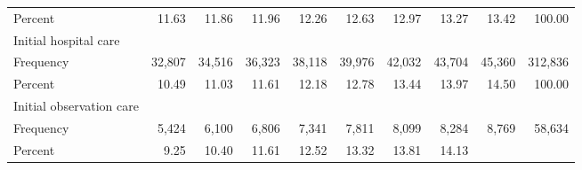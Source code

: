 \documentclass{article}
\begin{document}
\begin{table}[!h]
\begin{tabular}{llllllllll}
\multicolumn{1}{l}{\hspace{2em}Percent} &
  \multicolumn{1}{|r}{11.63} &
  \multicolumn{1}{r}{11.86} &
  \multicolumn{1}{r}{11.96} &
  \multicolumn{1}{r}{12.26} &
  \multicolumn{1}{r}{12.63} &
  \multicolumn{1}{r}{12.97} &
  \multicolumn{1}{r}{13.27} &
  \multicolumn{1}{r}{13.42} &
  \multicolumn{1}{r}{100.00} \\
\multicolumn{1}{l}{\hspace{1em}Initial hospital care} &
  \multicolumn{1}{|r}{} &
  \multicolumn{1}{r}{} &
  \multicolumn{1}{r}{} &
  \multicolumn{1}{r}{} &
  \multicolumn{1}{r}{} &
  \multicolumn{1}{r}{} &
  \multicolumn{1}{r}{} &
  \multicolumn{1}{r}{} &
  \multicolumn{1}{r}{} \\
\multicolumn{1}{l}{\hspace{2em}Frequency} &
  \multicolumn{1}{|r}{32,807} &
  \multicolumn{1}{r}{34,516} &
  \multicolumn{1}{r}{36,323} &
  \multicolumn{1}{r}{38,118} &
  \multicolumn{1}{r}{39,976} &
  \multicolumn{1}{r}{42,032} &
  \multicolumn{1}{r}{43,704} &
  \multicolumn{1}{r}{45,360} &
  \multicolumn{1}{r}{312,836} \\
\multicolumn{1}{l}{\hspace{2em}Percent} &
  \multicolumn{1}{|r}{10.49} &
  \multicolumn{1}{r}{11.03} &
  \multicolumn{1}{r}{11.61} &
  \multicolumn{1}{r}{12.18} &
  \multicolumn{1}{r}{12.78} &
  \multicolumn{1}{r}{13.44} &
  \multicolumn{1}{r}{13.97} &
  \multicolumn{1}{r}{14.50} &
  \multicolumn{1}{r}{100.00} \\
\multicolumn{1}{l}{\hspace{1em}Initial observation care} &
  \multicolumn{1}{|r}{} &
  \multicolumn{1}{r}{} &
  \multicolumn{1}{r}{} &
  \multicolumn{1}{r}{} &
  \multicolumn{1}{r}{} &
  \multicolumn{1}{r}{} &
  \multicolumn{1}{r}{} &
  \multicolumn{1}{r}{} &
  \multicolumn{1}{r}{} \\
\multicolumn{1}{l}{\hspace{2em}Frequency} &
  \multicolumn{1}{|r}{5,424} &
  \multicolumn{1}{r}{6,100} &
  \multicolumn{1}{r}{6,806} &
  \multicolumn{1}{r}{7,341} &
  \multicolumn{1}{r}{7,811} &
  \multicolumn{1}{r}{8,099} &
  \multicolumn{1}{r}{8,284} &
  \multicolumn{1}{r}{8,769} &
  \multicolumn{1}{r}{58,634} \\
\multicolumn{1}{l}{\hspace{2em}Percent} &
  \multicolumn{1}{|r}{9.25} &
  \multicolumn{1}{r}{10.40} &
  \multicolumn{1}{r}{11.61} &
  \multicolumn{1}{r}{12.52} &
  \multicolumn{1}{r}{13.32} &
  \multicolumn{1}{r}{13.81} &
  \multicolumn{1}{r}{14.13} &

\end{tabular}
\end{table}
\end{document}
